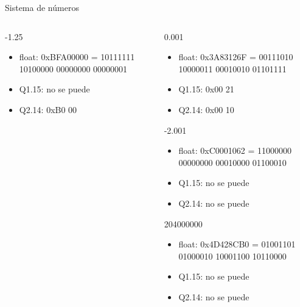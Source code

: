 \begin{frame}{Sistema de números}
{\begin{columns}[t]
\begin{column}{.4\textwidth}
\begin{itemize}
            \end{itemize}
            -1.25
            \begin{itemize}
               \item{float: 0xBFA00000 = 10111111 10100000 00000000 00000001}
               \item{Q1.15: no se puede}
               \item{Q2.14: 0xB0 00}
            \end{itemize}
         \end{column}
         \hspace{2pt}
         \vrule
         \hspace{2pt}
         \begin{column}{.6\textwidth}
            0.001
            \begin{itemize}
               \item{float: 0x3A83126F = 00111010 10000011 00010010 01101111}
               \item{Q1.15: 0x00 21}
               \item{Q2.14: 0x00 10}
            \end{itemize}
            -2.001
            \begin{itemize}
               \item{float: 0xC0001062 = 11000000 00000000 00010000 01100010}
               \item{Q1.15: no se puede}
               \item{Q2.14: no se puede}
            \end{itemize}
            204000000
            \begin{itemize}
               \item{float: 0x4D428CB0 = 01001101 01000010 10001100 10110000}
               \item{Q1.15: no se puede}
               \item{Q2.14: no se puede}
            \end{itemize}
         \end{column}
         \hspace{2pt}
      \end{columns}

   }
\end{frame}
